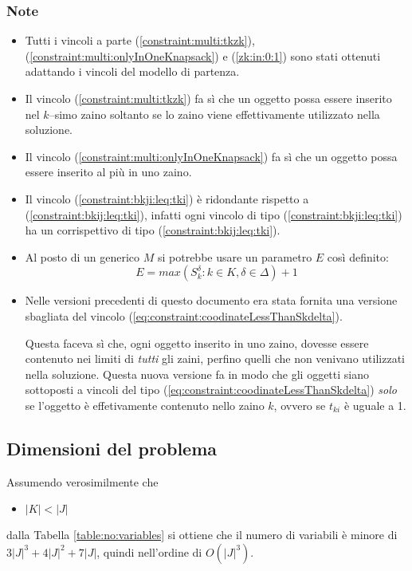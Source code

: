 \subsubsection{Note}
\begin{itemize}
\item Tutti i vincoli a parte (\ref{constraint:multi:tkzk}), 
(\ref{constraint:multi:onlyInOneKnapsack}) e (\ref{zk:in:0:1}) sono stati 
ottenuti adattando i vincoli del modello di partenza.
\item Il vincolo (\ref{constraint:multi:tkzk}) fa sì che un oggetto possa essere
 inserito nel $k$--simo zaino soltanto se lo zaino viene effettivamente 
 utilizzato nella soluzione.
\item Il vincolo (\ref{constraint:multi:onlyInOneKnapsack}) fa sì che un oggetto
possa essere inserito al più in uno zaino. 
\item Il vincolo (\ref{constraint:bkji:leq:tki}) è ridondante rispetto a 
(\ref{constraint:bkij:leq:tki}), infatti ogni vincolo di tipo
(\ref{constraint:bkji:leq:tki}) ha un corrispettivo di tipo 
(\ref{constraint:bkij:leq:tki}).
\item Al posto di un generico $M$ si potrebbe usare un 
parametro $E$ così definito:
$$
E = max(S_k^\delta : k \in K, \delta \in \Delta) + 1
$$ 
\item Nelle versioni precedenti di questo documento era stata fornita una
versione sbagliata del vincolo (\ref{eq:constraint:coodinateLessThanSkdelta}).

Questa faceva sì che, ogni oggetto inserito in uno zaino, 
dovesse essere contenuto nei limiti di \emph{tutti} gli zaini, perfino
quelli che non venivano utilizzati nella soluzione.
Questa nuova versione fa in modo che gli oggetti siano sottoposti a vincoli
del tipo (\ref{eq:constraint:coodinateLessThanSkdelta}) \emph{solo}
se l'oggetto è effetivamente contenuto nello zaino $k$, ovvero se 
$t_{ki}$ è uguale a 1.

\end{itemize}


\subsection{Dimensioni del problema}
\label{sec:orig:dimensioneDelProblema}
Assumendo verosimilmente che 
\begin{itemize}
	\item $|K| < |J|$
\end{itemize}  
dalla Tabella \ref{table:no:variables}
si ottiene che il numero di variabili è minore di $3|J|^3 + 4|J|^2 + 7|J|$, 
quindi nell'ordine di $O(|J|^3)$.



